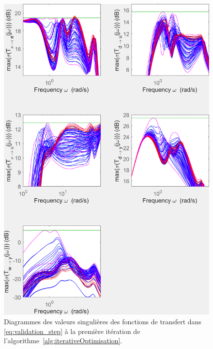 \begin{figure}[ht!]
    \centering
    \includegraphics[trim=0cm 0cm 0cm 0cm,clip,width=0.6\columnwidth]{figures/transferts_tcst.png}
    \caption{Diagrammes des valeurs singulières des fonctions de transfert dans \eqref{eq:validation_step} à la première itération de l'algorithme~\ref{alg:iterativeOptimisation}.}
    \label{fig:transferts_tcst}
\end{figure}


